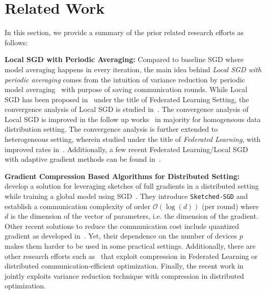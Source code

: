 \documentclass[twoside]{article}
\newcommand{\todo}[1]{\textcolor{red}{ToDo:~#1}}
\begin{document}
\section{Related Work}
In this section, we provide a summary of the prior related research efforts as follows:

\vspace{0.1in}\noindent\textbf{Local SGD with Periodic Averaging:}
Compared to baseline SGD where model averaging happens in every iteration, the main idea behind \emph{Local SGD with periodic averaging} comes from the intuition of variance reduction by periodic model averaging~\cite{zhang2016parallel} with purpose of saving communication rounds. While Local SGD has been proposed in~\cite{mcmahan2016communication,konevcny2016federated} under the title of Federated Learning Setting, the convergence analysis of Local SGD is studied in~\cite{zhou2018convergence,yu2019parallel,stich2019local,wang2018cooperative}. The convergence analysis of Local SGD is improved in the follow up works~\cite{haddadpour2019local,haddadpour2019trading,basu2019qsparse,haddadpour2019convergence,bayoumi2020tighter,stich2019error} in majority for homogeneous data distribution setting. The convergence analysis is further extended to heterogeneous setting, wherein studied under the title of \emph{Federated Learning}, with improved rates in~\cite{yu2019linear,li2019convergence,sahu2018convergence,liang2019variance,haddadpour2019convergence,karimireddy2019scaffold}. 
Additionally, a few recent Federated Learning/Local SGD with adaptive gradient methods can be found in~\cite{reddi2020adaptive,chen2020toward}.



\vspace{0.1in}\noindent\textbf{Gradient Compression Based Algorithms for Distributed Setting:}~\cite{ivkin2019communication} develop a solution for leveraging sketches of full gradients in a distributed setting while training a global model using SGD~\cite{robbins1951stochastic, bottou-bousquet-2008}. They introduce \texttt{Sketched-SGD} and establish a communication complexity of order $\mathcal{O}(\log(d))$ (per round) where $d$ is the dimension of the vector of parameters, i.e. the dimension of the gradient.
Other recent solutions to reduce the communication cost include quantized gradient as developed in~\cite{alistarh2017qsgd,lin2017deep,stich2018sparsified,horvath2019stochastic}. 
Yet, their dependence on the number of devices $p$ makes them harder to be used in some practical settings. Additionally, there are other research efforts such as~\cite{haddadpour2020federated,reisizadeh2020fedpaq,basu2019qsparse,horvath2019stochastic} that exploit compression in Federated Learning or distributed communication-efficient optimization. 
Finally, the recent work in~\cite{horvath2020better} jointly exploits variance reduction technique with compression in distributed optimization.
\end{document}
